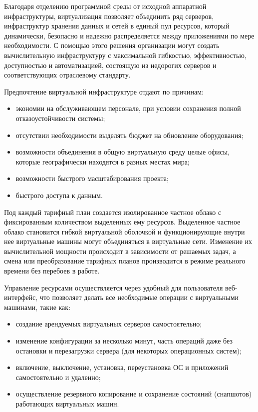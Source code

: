 Благодаря отделению программной среды от исходной аппаратной инфраструктуры, виртуализация позволяет объединить ряд серверов, инфраструктур хранения данных и сетей в единый пул ресурсов, который динамически, безопасно и надежно распределяется между приложениями по мере необходимости.
С помощью этого решения организации могут создать вычислительную инфраструктуру с максимальной гибкостью, эффективностью, доступностью и автоматизацией, состоящую из недорогих серверов и соответствующих отраслевому стандарту.

Предпочтение виртуальной инфраструктуре отдают по причинам:
\begin{itemize}
  \item экономии на обслуживающем персонале, при условии сохранения полной отказоустойчивости системы;
  \item отсутствии необходимости выделять бюджет на обновление оборудования;
  \item возможности объединения в общую виртуальную среду целые офисы, которые географически находятся в разных местах мира;
  \item возможности быстрого масштабирования проекта;
  \item быстрого доступа к данным.
\end{itemize}

Под каждый тарифный план создается изолированное частное облако с фиксированным количеством выделенных ему ресурсов.
Выделенное частное облако становится гибкой виртуальной оболочкой и функционирующие внутри нее виртуальные машины могут объединяться в виртуальные сети.
Изменение их вычислительной мощности происходит в зависимости от решаемых задач, а смена или преобразование тарифных планов производится в режиме реального времени без перебоев в работе.

Управление ресурсами осуществляется через удобный для пользователя веб-интерфейс, что позволяет делать все необходимые операции с виртуальными машинами, такие как:
\begin{itemize}
  \item создание арендуемых виртуальных серверов самостоятельно;
  \item изменение конфигурации за несколько минут, часть операций даже без остановки и перезагрузки сервера (для некоторых операционных систем);
  \item включение, выключение, установка, переустановка ОС и приложений самостоятельно и удаленно;
  \item осуществление резервного копирование и сохранение состояний (снапшотов) работающих виртуальных машин.
\end{itemize}

\clearpage

